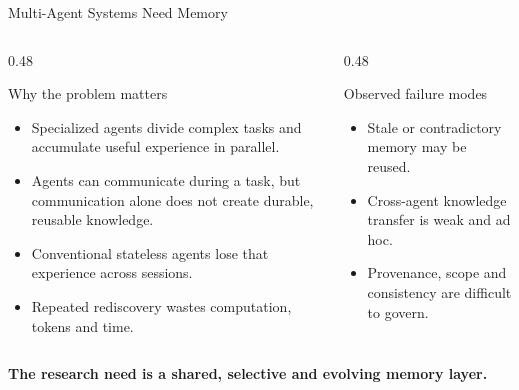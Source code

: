 \begin{frame}{Multi-Agent Systems Need Memory}
\begin{columns}[T,onlytextwidth]
\begin{column}{0.48\textwidth}
\begin{block}{Why the problem matters}
\begin{itemize}
\item Specialized agents divide complex tasks and accumulate useful experience in parallel.
\item Agents can communicate during a task, but communication alone does not create durable, reusable knowledge.
\item Conventional stateless agents lose that experience across sessions.
\item Repeated rediscovery wastes computation, tokens and time.
\end{itemize}
\end{block}
\end{column}
\begin{column}{0.48\textwidth}
\begin{alertblock}{Observed failure modes}
\begin{itemize}
\item Stale or contradictory memory may be reused.
\item Cross-agent knowledge transfer is weak and ad hoc.
\item Provenance, scope and consistency are difficult to govern.
\end{itemize}
\end{alertblock}
\end{column}
\end{columns}
\vspace{3mm}
\centering\large\textbf{The research need is a shared, selective and evolving memory layer.}
\end{frame}

